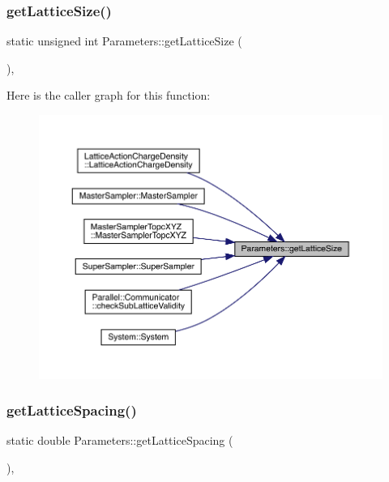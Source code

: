 \subsubsection{\texorpdfstring{getLatticeSize()}{getLatticeSize()}}
{\footnotesize\ttfamily static unsigned int Parameters\+::get\+Lattice\+Size (\begin{DoxyParamCaption}{ }\end{DoxyParamCaption})\hspace{0.3cm}{\ttfamily [inline]}, {\ttfamily [static]}}

Here is the caller graph for this function\+:
\nopagebreak
\begin{figure}[H]
\begin{center}
\leavevmode
\includegraphics[width=350pt]{class_parameters_a128ccc4cb31e9930a825cfd3b8e83d2e_icgraph}
\end{center}
\end{figure}
\mbox{\label{class_parameters_aabe7e3a2468cf11bb5e98e626cb94ff2}} 
\subsubsection{\texorpdfstring{getLatticeSpacing()}{getLatticeSpacing()}}
{\footnotesize\ttfamily static double Parameters\+::get\+Lattice\+Spacing (\begin{DoxyParamCaption}{ }\end{DoxyParamCaption})\hspace{0.3cm}{\ttfamily [inline]}, {\ttfamily [static]}}

